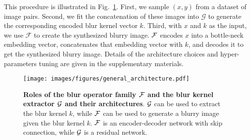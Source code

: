 \documentclass[final]{cvpr}
\newcommand{\Fref}[1]{Fig.~\ref{#1}}
\begin{document}
This procedure is illustrated in \Fref{fig:general_architecture}. First, we sample $(x, y)$ from a dataset of image pairs. Second, we fit the concatenation of these images into $\mathcal{G}$ to generate the corresponding encoded blur kernel vector $k$. Third, with $x$ and $k$ as the input, we use $\mathcal{F}$ to create the synthesized blurry image. $\mathcal{F}$ encodes $x$ into a bottle-neck embedding vector, concatenates that embedding vector with $k$, and decodes it to get the synthesized blurry image.
Details of the architecture choices and hyper-parameters tuning are given in the supplementary materials.



\begin{figure}[t]
    \centering
    \texttt{[image: images/figures/general\_architecture.pdf]}
    \caption{{\bf Roles of the blur operator family $\mathcal{F}$ and the blur kernel extractor $\mathcal{G}$ and their architectures}. $\mathcal{G}$ can be used to extract the blur kernel $k$, while $\mathcal{F}$ can be used to generate a blurry image given the blur kernel $k$. $\mathcal{F}$ is an encoder-decoder network with skip connection, while $\mathcal{G}$ is a residual network. } \label{fig:general_architecture}
\end{figure}


\end{document}
